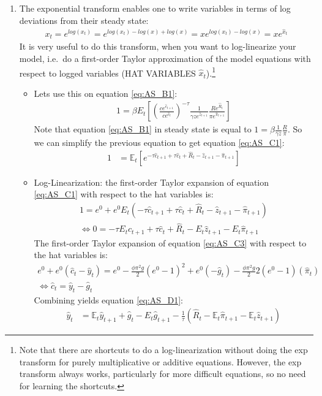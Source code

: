 \begin{enumerate}
\item The exponential transform enables one to write variables in terms of log deviations from their steady state:
\begin{align*}
x_t = e^{log(x_t)} = e^{log(x_t) - log(x) + log(x)} = x e^{log(x_t)-log(x)} = x e^{\hat{x}_t}
\end{align*}
It is very useful to do this transform, when you want to log-linearize your model,
  i.e.\ do a first-order Taylor approximation of the model equations with respect to logged variables (HAT VARIABLES $\hat{x}_t$).\footnote{
Note that there are shortcuts to do a log-linearization without doing the exp transform for purely multiplicative or additive equations.
However, the exp transform always works, particularly for more difficult equations, so no need for learning the shortcuts.
}
\begin{itemize}    
    \item Lets use this on equation \eqref{eq:AS_B1}:
    \begin{align*}
    1 = \beta E_t \left[ \left(\frac{c e^{\hat{c}_{t+1}}}{c e^{\hat{c}_t}}\right)^{-\tau} \frac{1}{\gamma z e^{\hat{z}_{t+1}}} \frac{R e^{\hat{R}_t}}{\pi e^{\hat{\pi}_{t+1}}} \right]
    \end{align*}
    Note that equation \eqref{eq:AS_B1} in steady state is equal to $1 = \beta \frac{1}{\gamma z}\frac{R}{\pi}$.
    So we can simplify the previous equation to get equation \eqref{eq:AS_C1}:
    \begin{align*}
    1 &= \mathbb{E}_t \left[e^{-\tau \hat{c}_{t+1} + \tau \hat{c}_{t} + \hat{R}_{t} - \hat{z}_{t+1} - \hat{\pi}_{t+1} }\right]
    \end{align*}    
    \item Log-Linearization: the first-order Taylor expansion of equation \eqref{eq:AS_C1} with respect to the hat variables is:
    \begin{align*}
    1 = e^0 + e^0 E_t \left(-\tau \hat{c}_{t+1} + \tau \hat{c}_{t} + \hat{R}_{t} - \hat{z}_{t+1} - \hat{\pi}_{t+1}  \right)\\
    \Leftrightarrow
    0 = -\tau E_t \hat{c}_{t+1} + \tau \hat{c}_{t} + \hat{R}_{t} - E_t\hat{z}_{t+1} - E_t \hat{\pi}_{t+1}
    \end{align*}
    The first-order Taylor expansion of equation \eqref{eq:AS_C3} with respect to the hat variables is:
    \begin{align*}
    e^0 + e^0\left(\hat{c}_t - \hat{y}_t\right) = e^0 - \frac{\phi \pi^2 g}{2} (e^0-1)^2 + e^0(-\hat{g}_t) - \frac{\phi \pi^2 g}{2} 2 \left(e^0-1\right)(\hat{\pi}_t)\\
    \Leftrightarrow \hat{c}_t = \hat{y}_t -\hat{g}_t
    \end{align*}
    Combining yields equation \eqref{eq:AS_D1}:
    \begin{align*}
    \hat{y}_{t} &= \mathbb{E}_t \hat{y}_{t+1} + \hat{g}_{t} - E_t\hat{g}_{t+1} - \frac{1}{\tau} \left(\hat{R}_{t}- \mathbb{E}_t \hat{\pi}_{t+1} - \mathbb{E}_t \hat{z}_{t+1}\right)
    \end{align*}
\end{itemize}


\end{enumerate}
